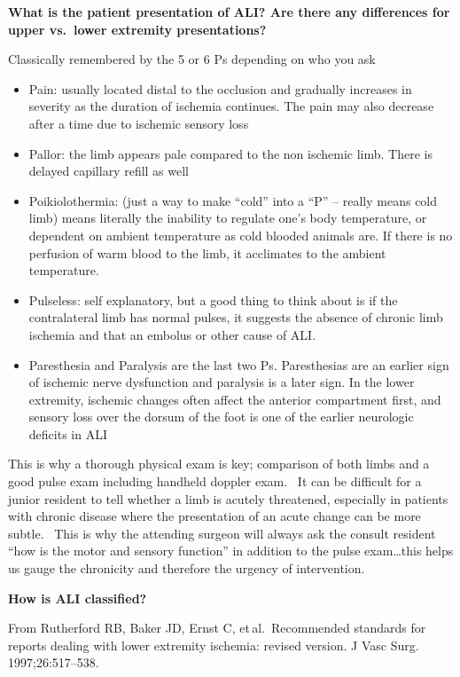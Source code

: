 \documentclass[
]{book}
\begin{document}
\textbf{What is the patient presentation of ALI? Are there any differences for
upper vs.~lower extremity presentations?}

Classically remembered by the 5 or 6 Ps depending on who you ask

\begin{itemize}
\item
  Pain: usually located distal to the occlusion and gradually
  increases in severity as the duration of ischemia continues. The
  pain may also decrease after a time due to ischemic sensory loss
\item
  Pallor: the limb appears pale compared to the non ischemic limb.
  There is delayed capillary refill as well
\item
  Poikiolothermia: (just a way to make ``cold'' into a ``P'' -- really
  means cold limb) means literally the inability to regulate one's
  body temperature, or dependent on ambient temperature as cold
  blooded animals are. If there is no perfusion of warm blood to the
  limb, it acclimates to the ambient temperature.~
\item
  Pulseless: self explanatory, but a good thing to think about is if
  the contralateral limb has normal pulses, it suggests the absence of
  chronic limb ischemia and that an embolus or other cause of ALI.~
\item
  Paresthesia and Paralysis are the last two Ps. Paresthesias are an
  earlier sign of ischemic nerve dysfunction and paralysis is a later
  sign. In the lower extremity, ischemic changes often affect the
  anterior compartment first, and sensory loss over the dorsum of the
  foot is one of the earlier neurologic deficits in ALI
\end{itemize}

This is why a thorough physical exam is key; comparison of both limbs
and a good pulse exam including handheld doppler exam.~ It can be
difficult for a junior resident to tell whether a limb is acutely
threatened, especially in patients with chronic disease where the
presentation of an acute change can be more subtle.~ This is why the
attending surgeon will always ask the consult resident ``how is the motor
and sensory function'' in addition to the pulse exam\ldots this helps us
gauge the chronicity and therefore the urgency of intervention.

\textbf{How is ALI classified?}

From Rutherford RB, Baker JD, Ernst C, et\,al.~Recommended standards for
reports dealing with lower extremity ischemia: revised version. J Vasc
Surg. 1997;26:517--538. \citep{rutherfordRecommendedStandardsReports1997}
\end{document}
